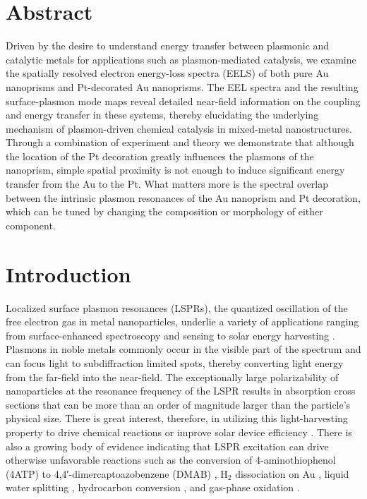 \documentclass [11pt, proquest] {uwthesis}[2016/11/22]
\begin{document}
\section{Abstract}

Driven by the desire to understand energy transfer between plasmonic and catalytic metals for applications such as plasmon-mediated catalysis, we examine the spatially resolved electron energy-loss spectra (EELS) of both pure Au nanoprisms and Pt-decorated Au nanoprisms. The EEL spectra and the resulting surface-plasmon mode maps reveal detailed near-field information on the coupling and energy transfer in these systems, thereby elucidating the underlying mechanism of plasmon-driven chemical catalysis in mixed-metal nanostructures. Through a combination of experiment and theory we demonstrate that although the location of the Pt decoration greatly influences the plasmons of the nanoprism, simple spatial proximity is not enough to induce significant energy transfer from the Au to the Pt. What matters more is the spectral overlap between the intrinsic plasmon resonances of the Au nanoprism and Pt decoration, which can be tuned by changing the composition or morphology of either component.

\section{Introduction}
Localized surface plasmon resonances (LSPRs), the quantized oscillation of the free electron gas in metal nanoparticles, underlie a variety of applications ranging from surface-enhanced spectroscopy \cite{Nie1997,Schlucker,SERS_1,SERS_femto,COINs} and sensing \cite{PCCP,SpecSense} to solar energy harvesting \cite{OPV,waveguides,SiSolar,RiceCrew}. Plasmons in noble metals commonly occur in the visible part of the spectrum and can focus light to subdiffraction limited spots, thereby converting light energy from the far-field into the near-field. The exceptionally large polarizability of nanoparticles at the resonance frequency of the LSPR results in absorption cross sections that can be more than an order of magnitude larger than the particle’s physical size. There is great interest, therefore, in utilizing this light-harvesting property to drive chemical reactions \cite{aminothiophenol,PtAuRods,PtAuPrisms,Halas2013} or improve solar device efficiency \cite{OPV,SiSolar,Linic}. There is also a growing body of evidence indicating that LSPR excitation can drive otherwise unfavorable reactions such as the conversion of 4-aminothiophenol (4ATP) to 4,4′-dimercaptoazobenzene (DMAB) \cite{aminothiophenol,nitrobenzenethiol,KimKimShin}, H$_2$ dissociation on Au \cite{Halas2013}, liquid water splitting \cite{watersplitting,photoanodes,Thimsen}, hydrocarbon conversion \cite{Cronin}, and gas-phase oxidation \cite{LinicSilver}.
\end{document}
